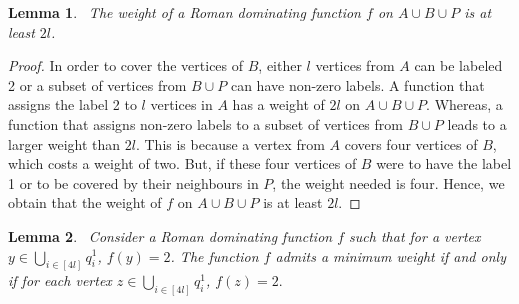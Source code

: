 \documentclass[preprint,12pt]{elsarticle}
\newtheorem{lemma}{Lemma}
\begin{document}
\begin{lemma}~\label{weight2b}
     The weight of a Roman dominating function $f$ on $A \cup B \cup P$ is at least $2l$.
\end{lemma}
\begin{proof}
    In order to cover the vertices of $B$, either $l$ vertices from $A$ can be labeled 2 or a subset of vertices from $B \cup P$ can have non-zero labels. A function that assigns the label 2 to $l$ vertices in $A$ has a weight of $2l$ on $A \cup B \cup P$. Whereas, a function that assigns non-zero labels to a subset of vertices from $B \cup P$ leads to a larger weight than $2l$. This is because a vertex from $A$ covers four vertices of $B$, which costs a weight of two. But, if these four vertices of $B$ were to have the label 1 or to be covered by their neighbours in $P$, the weight needed is four. Hence, we obtain that the weight of $f$ on $A \cup B \cup P$ is at least $2l$.
\end{proof}
\begin{lemma}~\label{sameindex}
    Consider a Roman dominating function $f$ such that for a vertex $y \in \bigcup\limits_{i \in [4l]} q_i^1$, $f(y) = 2$. The function $f$ admits a minimum weight if and only if for each vertex $z \in \bigcup\limits_{i \in [4l]} q_i^1$, $f(z) = 2.$
\end{lemma}
\end{document}
